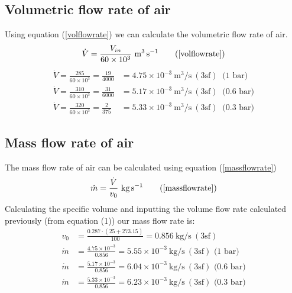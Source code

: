 \documentclass[class=article, crop=false, 12pt,a4paper]{standalone}
\numberwithin{equation}{section}
\begin{document}
\subsection{Volumetric flow rate of air}
Using equation (\ref{volflowrate}) we can calculate the volumetric flow rate of air.
\begin{equation}
  \dot{V} = \frac{V_{in}}{60 \times 10^3} \ \si{\meter\cubed\per\second}
  \tag{\ref{volflowrate}}
\end{equation}
\begin{align}
  \dot{V} = \frac{285}{60\times 10^3} = \frac{19}{4000} &= 4.75 \times 10^{-3} \ \si{\meter\cubed\per\second} \ (3\textrm{sf}) \ \textrm{ (1 bar)}\\
  \dot{V} = \frac{310}{60\times 10^3} = \frac{31}{6000} &= 5.17 \times 10^{-3} \ \si{\meter\cubed\per\second} \ (3\textrm{sf}) \ \textrm{ (0.6 bar)}\\
  \dot{V} = \frac{320}{60\times 10^3} = \frac{2}{375} &= 5.33 \times 10^{-3} \ \si{\meter\cubed\per\second} \ (3\textrm{sf}) \ \textrm{ (0.3 bar)}
\end{align}
\subsection{Mass flow rate of air}
The mass flow rate of air can be calculated using equation (\ref{massflowrate})
\begin{equation}
  \dot{m} = \frac{\dot{V}}{v_0} \ \si{\kg\per\second}
  \tag{\ref{massflowrate}}
\end{equation}
Calculating the specific volume and inputting the volume flow rate calculated previously (from equation (1)) our mass flow rate is:
\begin{align}
  v_0 &= \frac{0.287 \cdot (25+273.15)}{100} = 0.856 \ \si{\kg\per\second} \ (3\textrm{sf})  \\
  \dot{m} &= \frac{4.75 \times 10^{-3}}{0.856} = 5.55 \times 10^{-3} \ \si{\kg\per\second} \ (3\textrm{sf}) \textrm{ (1 bar)} \\
  \dot{m} &= \frac{5.17 \times 10^{-3}}{0.856} = 6.04 \times 10^{-3} \ \si{\kg\per\second} \ (3\textrm{sf}) \textrm{ (0.6 bar)} \\
  \dot{m} &= \frac{5.33 \times 10^{-3}}{0.856} = 6.23 \times 10^{-3} \ \si{\kg\per\second} \ (3\textrm{sf}) \textrm{ (0.3 bar)}
\end{align}
\end{document}
